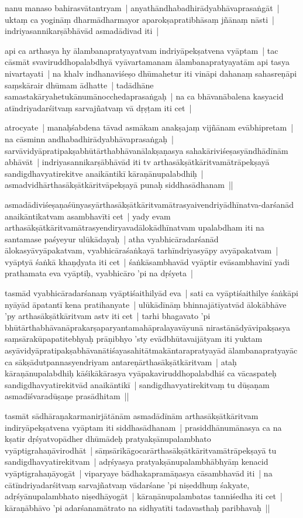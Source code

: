 \documentclass[article,12pt,a4paper]{memoir}
\begin{document}
	  \pstart nanu manaso bahirasvātantryam | anyathāndhabadhirādyabhāvaprasaṅgāt | uktaṃ ca yogināṃ dharmādharmayor aparokṣapratibhāsaṃ jñānaṃ nāsti | indriyasannikarṣābhāvād asmadādivad iti | 
	\pend
      

	  \pstart api ca arthasya hy ālambanapratyayatvam indriyāpekṣatvena vyāptam | tac cāsmāt svaviruddhopalabdhyā vyāvartamanam ālambanapratyayatām api tasya nivartayati | na khalv indhanaviśeṣo dhūmahetur iti vināpi dahanaṃ sahasreṇāpi saṃskārair dhūmam ādhatte | tadādhāne samastakāryahetukānumānocchedaprasaṅgaḥ | na ca bhāvanābalena kasyacid atīndriyadarśitvaṃ sarvajñatvaṃ vā dṛṣṭam iti cet | 
	\pend
      

	  \pstart atrocyate | manaḥśabdena tāvad asmākam anakṣajaṃ vijñānam evābhipretam | na cāsminn andhabadhirādyabhāvaprasaṅgaḥ | sarvāvidyāpratipakṣabhūtārthabhāvanālakṣaṇasya sahakāriviśeṣasyāndhādīnām abhāvāt | indriyasannikarṣābhāvād iti tv arthasākṣātkāritvamātrāpekṣayā sandigdhavyatirekitve anaikāntikī kāraṇānupalabdhiḥ | asmadvidhārthasākṣātkāritvāpekṣayā punaḥ siddhasādhanam || 
	\pend
      

	  \pstart asmadādiviśeṣaṇaśūnyasyārthasākṣātkāritvamātrasyaivendriyādhīnatva-darśanād anaikāntikatvam asambhavīti cet | yady evam arthasākṣātkāritvamātrasyendiryavadālokādhīnatvam upalabdham iti na santamase paśyeyur ulūkādayaḥ | atha vyabhicāradarśanād ālokasyāvyāpakatvam, vyabhicāraśaṅkayā tarhīndriyasyāpy avyāpakatvam | vyāptyā śaṅkā khaṇḍyata iti cet | śaṅkāsambhavād vyāptir evāsambhavinī yadi prathamata eva vyāptiḥ, vyabhicāro 'pi na dṛśyeta | 
	\pend
      

	  \pstart tasmād vyabhicāradarśanaṃ vyāptiśaithilyād eva | sati ca vyāptiśaithilye śaṅkāpi nyāyād āpatantī kena pratihanyate | ulūkādīnāṃ bhinnajātīyatvād ālokābhāve 'py arthasākṣātkāritvam astv iti cet | tarhi bhagavato 'pi bhūtārthabhāvanāprakarṣaparyantamahāpralayavāyunā nirastānādyāvipakṣasya saṃsārakūpapatitebhyaḥ prāṇibhyo 'sty evādbhūtavaijātyam iti yuktam asyāvidyāpratipakṣabhāvanātiśayasahitātmakāntarapratyayād ālambanapratyayāc ca sākṣādutpannasyendriyam antareṇārthasākṣātkāritvam | ataḥ kāraṇānupalabdhiḥ kāśikākārasya vyāpakaviruddhopalabdhiś ca vācaspateḥ sandigdhavyatirekitvād anaikāntikī | sandigdhavyatirekitvaṃ tu dūṣaṇam asmadīśvaradūṣaṇe prasādhitam || 
	\pend
      

	  \pstart tasmāt sādhāraṇakarmanirjātānām asmadādīnām arthasākṣātkāritvam indiryāpekṣatvena vyāptam iti siddhasādhanam | prasiddhānumānasya ca na kṣatir dṛśyatvopādher dhūmādeḥ pratyakṣānupalambhato vyāptigrahaṇāvirodhāt | sāṃsārikāgocarārthasākṣātkāritvamātrāpekṣayā tu sandigdhavyatirekitvam | adṛśyasya pratyakṣānupalambhābhyāṃ kenacid vyāptigrahaṇāyogāt | viparyaye bādhakapramāṇasya cāsambhavād iti | na cātīndriyadarśitvaṃ sarvajñatvaṃ vādarśane 'pi niṣeddhuṃ śakyate, adṛśyānupalambhato niṣedhāyogāt | kāraṇānupalambatas tanniśedha iti cet | kāraṇābhāvo 'pi adarśanamātrato na sidhyatīti tadavasthaḥ paribhavaḥ || 
	\pend
      
\end{document}
